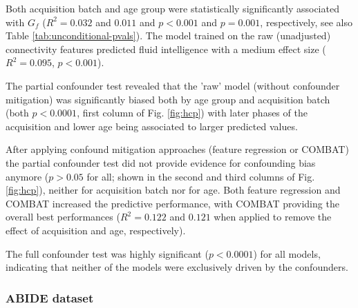 \documentclass{article}
\begin{document}
Both acquisition batch and age group were statistically significantly associated with $G_f$ ($R^2=0.032$ and $0.011$ and $p<0.001$ and $p=0.001$, respectively, see also Table \ref{tab:unconditional-pvals}). The model trained on the raw (unadjusted) connectivity features predicted fluid intelligence with a medium effect size ($R^2=0.095$, $p<0.001$).

The partial confounder test revealed that the 'raw' model (without confounder mitigation) was significantly biased both by age group and acquisition batch (both $p<0.0001$, first column of Fig. \ref{fig:hcp}) with later phases of the acquisition and lower age being associated to larger predicted values.

After applying confound mitigation approaches (feature regression or COMBAT) the partial confounder test did not provide evidence for confounding bias anymore ($p > 0.05$ for all; shown in the second and third columns of Fig. \ref{fig:hcp}), neither for acquisition batch nor for age. Both feature regression and COMBAT increased the predictive performance, with COMBAT providing the overall best performances ($R^2=0.122$ and $0.121$ when applied to remove the effect of acquisition and age, respectively).

The full confounder test was highly significant ($p<0.0001$) for all models, indicating that neither of the models were exclusively driven by the confounders.

\subsubsection*{ABIDE dataset}
\end{document}

